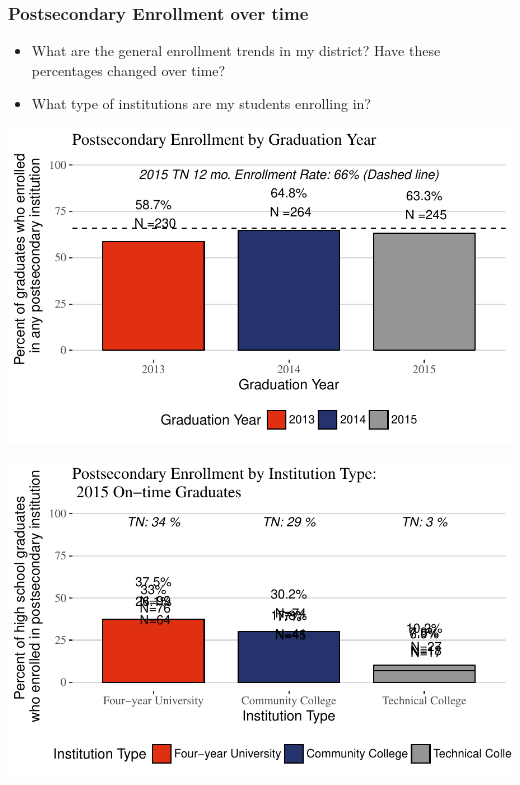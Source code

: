 \documentclass[11pt,]{article}
\providecommand{\tightlist}{%
  \setlength{\itemsep}{0pt}\setlength{\parskip}{0pt}}
\begin{document}
\subsubsection{Postsecondary Enrollment over
time}\label{postsecondary-enrollment-over-time}

\begin{itemize}
\tightlist
\item
  What are the general enrollment trends in my district? Have these
  percentages changed over time?
\item
  What type of institutions are my students enrolling in?
\end{itemize}

\begin{center}\includegraphics{20170511_PSWRR_files/figure-latex/Enrollment over time-1} \end{center}

\begin{center}\includegraphics{20170511_PSWRR_files/figure-latex/District by Type-1} \end{center}
\end{document}
